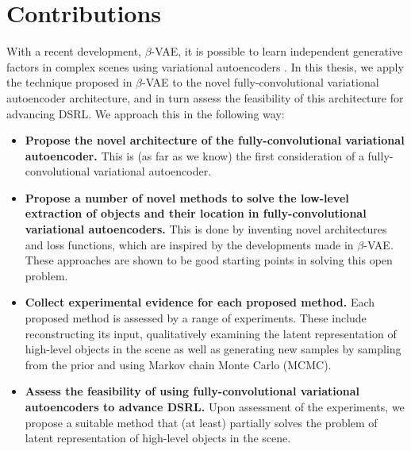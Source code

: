 \section{Contributions}

With a recent development, $\beta$-VAE, it is possible to learn independent generative factors in complex scenes using variational autoencoders \cite{Higgins2016}. In this thesis, we apply the technique proposed in $\beta$-VAE to the novel fully-convolutional variational autoencoder architecture, and in turn assess the feasibility of this architecture for advancing DSRL. We approach this in the following way:
\begin{itemize}
\item \textbf{Propose the novel architecture of the fully-convolutional variational autoencoder.} This is (as far as we know) the first consideration of a fully-convolutional variational autoencoder.
\item \textbf{Propose a number of novel methods to solve the low-level extraction of objects and their location in fully-convolutional variational autoencoders.} This is done by inventing novel architectures and loss functions, which are inspired by the developments made in $\beta$-VAE. These approaches are shown to be good starting points in solving this open problem.
\item \textbf{Collect experimental evidence for each proposed method.} Each proposed method is assessed by a range of experiments. These include reconstructing its input, qualitatively examining the latent representation of high-level objects in the scene as well as generating new samples by sampling from the prior and using Markov chain Monte Carlo (MCMC).
\item \textbf{Assess the feasibility of using fully-convolutional variational autoencoders to advance DSRL.} Upon assessment of the experiments, we propose a suitable method that (at least) partially solves the problem of latent representation of high-level objects in the scene.
\end{itemize}